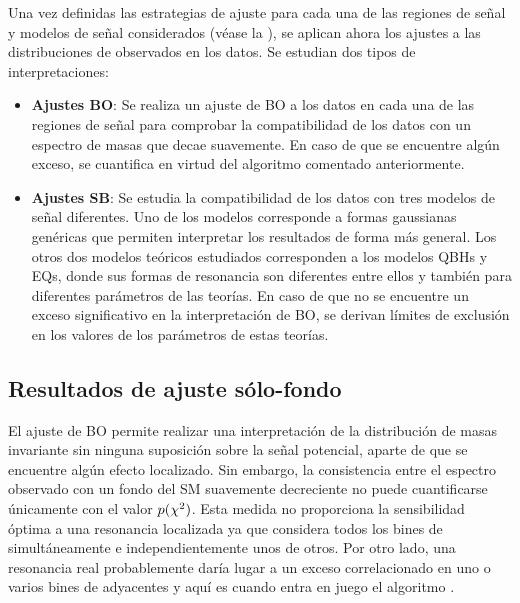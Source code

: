 Una vez definidas las estrategias de ajuste para cada una de las regiones de señal y modelos de señal considerados (véase la \Tab{\ref{tab:bkg:modeling:strategy_modeling:summary}}), se aplican ahora los ajustes a las distribuciones de \myj observados en los datos. Se estudian dos tipos de interpretaciones:
\begin{itemize}
    \item \textbf{Ajustes \Acf{BO}}: Se realiza un ajuste de \ac{BO} a los datos en cada una de las regiones de señal para comprobar la compatibilidad de los datos con un espectro de masas que decae suavemente. En caso de que se encuentre algún exceso, se cuantifica en virtud del algoritmo \bh comentado anteriormente.
    \item \textbf{Ajustes \Acf{SB}}: Se estudia la compatibilidad de los datos con tres modelos de señal diferentes. Uno de los modelos corresponde a formas gaussianas genéricas que permiten interpretar los resultados de forma más general. Los otros dos modelos teóricos estudiados corresponden a los modelos \acp{QBH} y \acp{EQ}, donde sus formas de resonancia son diferentes entre ellos y también para diferentes parámetros de las teorías. En caso de que no se encuentre un exceso significativo en la interpretación de \ac{BO}, se derivan límites de exclusión en los valores de los parámetros de estas teorías.
\end{itemize}







\subsection{Resultados de ajuste sólo-fondo}
\label{subsec:results:results:bkgonly}

El ajuste de \ac{BO} permite realizar una interpretación de la distribución de masas invariante sin ninguna suposición sobre la señal potencial, aparte de que se encuentre algún efecto localizado. Sin embargo, la consistencia entre el espectro \myj observado con un fondo del \ac{SM} suavemente decreciente no puede cuantificarse únicamente con el valor \(p(\chi^{2})\). Esta medida no proporciona la sensibilidad óptima a una resonancia localizada ya que considera todos los bines de \myj simultáneamente e independientemente unos de otros. Por otro lado, una resonancia real probablemente daría lugar a un exceso correlacionado en uno o varios bines de \myj adyacentes y aquí es cuando entra en juego el algoritmo \bh.

